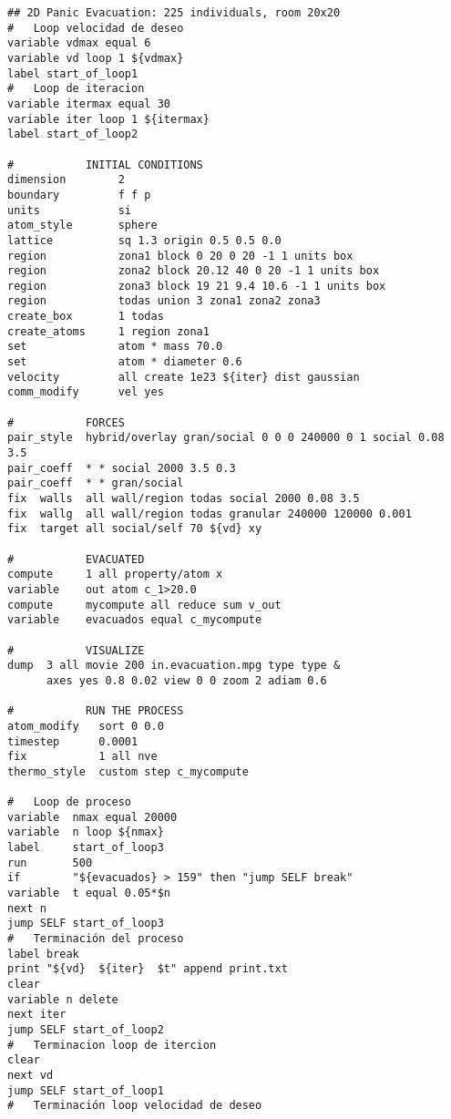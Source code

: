 \begin{verbatim}
## 2D Panic Evacuation: 225 individuals, room 20x20
#	Loop velocidad de deseo
variable vdmax equal 6
variable vd loop 1 ${vdmax}
label start_of_loop1
#	Loop de iteracion
variable itermax equal 30
variable iter loop 1 ${itermax}
label start_of_loop2

#           INITIAL CONDITIONS
dimension        2
boundary         f f p
units            si
atom_style       sphere
lattice          sq 1.3 origin 0.5 0.5 0.0
region           zona1 block 0 20 0 20 -1 1 units box
region           zona2 block 20.12 40 0 20 -1 1 units box
region           zona3 block 19 21 9.4 10.6 -1 1 units box
region           todas union 3 zona1 zona2 zona3
create_box       1 todas
create_atoms     1 region zona1
set              atom * mass 70.0
set              atom * diameter 0.6
velocity         all create 1e23 ${iter} dist gaussian
comm_modify      vel yes

#           FORCES
pair_style  hybrid/overlay gran/social 0 0 0 240000 0 1 social 0.08 3.5
pair_coeff  * * social 2000 3.5 0.3
pair_coeff  * * gran/social
fix  walls  all wall/region todas social 2000 0.08 3.5
fix  wallg  all wall/region todas granular 240000 120000 0.001    
fix  target all social/self 70 ${vd} xy          

#           EVACUATED
compute     1 all property/atom x
variable    out atom c_1>20.0
compute     mycompute all reduce sum v_out
variable    evacuados equal c_mycompute

#           VISUALIZE
dump  3 all movie 200 in.evacuation.mpg type type &
      axes yes 0.8 0.02 view 0 0 zoom 2 adiam 0.6

#           RUN THE PROCESS
atom_modify   sort 0 0.0
timestep      0.0001
fix           1 all nve
thermo_style  custom step c_mycompute

#	Loop de proceso
variable  nmax equal 20000
variable  n loop ${nmax}
label     start_of_loop3
run       500
if        "${evacuados} > 159" then "jump SELF break"
variable  t equal 0.05*$n
next n
jump SELF start_of_loop3
#	Terminación del proceso
label break
print "${vd}  ${iter}  $t" append print.txt
clear
variable n delete
next iter
jump SELF start_of_loop2
#	Terminacion loop de itercion
clear
next vd
jump SELF start_of_loop1
#	Terminación loop velocidad de deseo
\end{verbatim}
